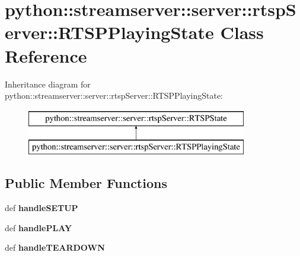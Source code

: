 \hypertarget{classpython_1_1streamserver_1_1server_1_1rtspServer_1_1RTSPPlayingState}{
\section{python::streamserver::server::rtspServer::RTSPPlayingState Class Reference}
\label{classpython_1_1streamserver_1_1server_1_1rtspServer_1_1RTSPPlayingState}
}
Inheritance diagram for python::streamserver::server::rtspServer::RTSPPlayingState:\begin{figure}[H]
\begin{center}
\leavevmode
\includegraphics[height=2.000000cm]{classpython_1_1streamserver_1_1server_1_1rtspServer_1_1RTSPPlayingState}
\end{center}
\end{figure}
\subsection*{Public Member Functions}
\begin{DoxyCompactItemize}
\item 
\hypertarget{classpython_1_1streamserver_1_1server_1_1rtspServer_1_1RTSPPlayingState_a5597a91d11df6aeaf316020db662842f}{
def {\bfseries handleSETUP}}
\label{classpython_1_1streamserver_1_1server_1_1rtspServer_1_1RTSPPlayingState_a5597a91d11df6aeaf316020db662842f}

\item 
\hypertarget{classpython_1_1streamserver_1_1server_1_1rtspServer_1_1RTSPPlayingState_a9abc670a45c75206620433616d8b3ca2}{
def {\bfseries handlePLAY}}
\label{classpython_1_1streamserver_1_1server_1_1rtspServer_1_1RTSPPlayingState_a9abc670a45c75206620433616d8b3ca2}

\item 
\hypertarget{classpython_1_1streamserver_1_1server_1_1rtspServer_1_1RTSPPlayingState_a16dcc5de6225033e57f9445f13cd872c}{
def {\bfseries handleTEARDOWN}}
\label{classpython_1_1streamserver_1_1server_1_1rtspServer_1_1RTSPPlayingState_a16dcc5de6225033e57f9445f13cd872c}

\end{DoxyCompactItemize}


